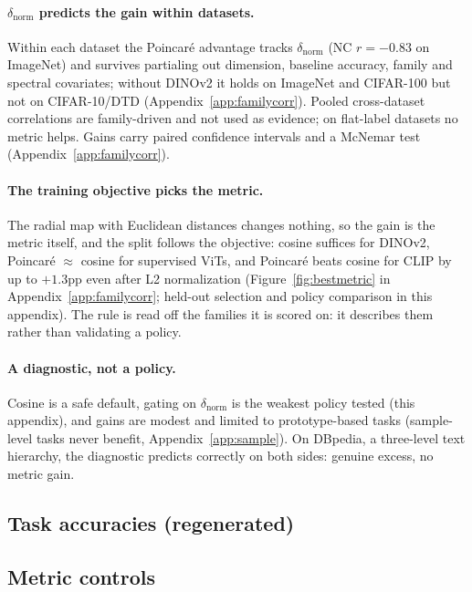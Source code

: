 \documentclass{article}
\begin{document}
\paragraph{$\delta_{\text{norm}}$ predicts the gain within datasets.} Within each dataset the Poincar\'{e} advantage tracks $\delta_{\text{norm}}$ (NC $r=-0.83$ on ImageNet) and survives partialing out dimension, baseline accuracy, family and spectral covariates; without DINOv2 it holds on ImageNet and CIFAR-100 but not on CIFAR-10/DTD (Appendix~\ref{app:familycorr}). Pooled cross-dataset correlations are family-driven and not used as evidence; on flat-label datasets no metric helps. Gains carry paired confidence intervals and a McNemar test (Appendix~\ref{app:familycorr}). %

\paragraph{The training objective picks the metric.} The radial map with Euclidean distances changes nothing, so the gain is the metric itself, and the split follows the objective: cosine suffices for DINOv2, Poincar\'{e} $\approx$ cosine for supervised ViTs, and Poincar\'{e} beats cosine for CLIP by up to $+1.3$pp even after L2 normalization (Figure~\ref{fig:bestmetric} in Appendix~\ref{app:familycorr}; held-out selection and policy comparison in this appendix). The rule is read off the families it is scored on: it describes them rather than validating a policy. %

\paragraph{A diagnostic, not a policy.} Cosine is a safe default, gating on $\delta_{\text{norm}}$ is the weakest policy tested (this appendix), and gains are modest and limited to prototype-based tasks (sample-level tasks never benefit, Appendix~\ref{app:sample}). On DBpedia, a three-level text hierarchy, the diagnostic predicts correctly on both sides: genuine excess, no metric gain. %
\FloatBarrier
\subsection{Task accuracies (regenerated)}


\FloatBarrier
\subsection{Metric controls}


\FloatBarrier
\end{document}
